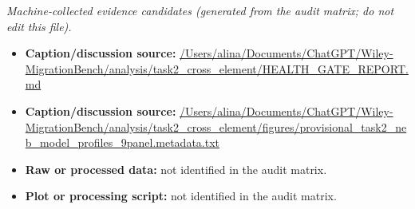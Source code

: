 \emph{Machine-collected evidence candidates (generated from the audit matrix; do not edit this file).}
\begin{itemize}[leftmargin=1.4em,noitemsep]
\item \textbf{Caption/discussion source:} \url{/Users/alina/Documents/ChatGPT/Wiley-MigrationBench/analysis/task2_cross_element/HEALTH_GATE_REPORT.md}
\item \textbf{Caption/discussion source:} \url{/Users/alina/Documents/ChatGPT/Wiley-MigrationBench/analysis/task2_cross_element/figures/provisional_task2_neb_model_profiles_9panel.metadata.txt}
\item \textbf{Raw or processed data:} not identified in the audit matrix.
\item \textbf{Plot or processing script:} not identified in the audit matrix.
\end{itemize}
